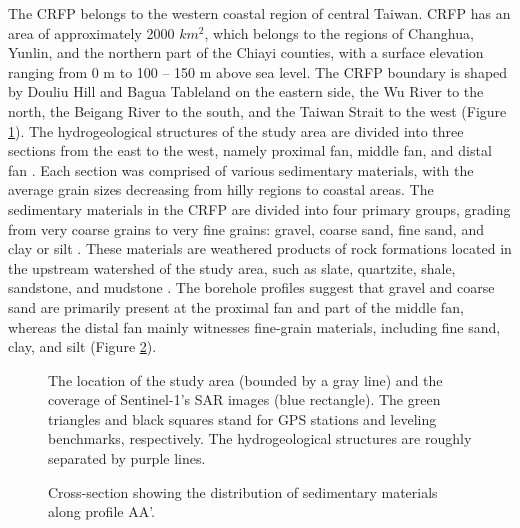 
The CRFP belongs to the western coastal region of central Taiwan. CRFP has an area of approximately 2000 $km^2$, which belongs to the regions of Changhua, Yunlin, and the northern part of the Chiayi counties, with a surface elevation ranging from 0 m to 100 – 150 m above sea level. The CRFP boundary is shaped by Douliu Hill and Bagua Tableland on the eastern side, the Wu River to the north, the Beigang River to the south, and the Taiwan Strait to the west (Figure \ref{fig:studyarea}).
The hydrogeological structures of the study area are divided into three sections from the east to the west, namely proximal fan, middle fan, and distal fan \citep{RN46}. Each section was comprised of various sedimentary materials, with the average grain sizes decreasing from hilly regions to coastal areas. The sedimentary materials in the CRFP are divided into four primary groups, grading from very coarse grains to very fine grains: gravel, coarse sand, fine sand, and clay or silt \citep{RN46}. These materials are weathered products of rock formations located in the upstream watershed of the study area, such as slate, quartzite, shale, sandstone, and mudstone \citep{RN17, RN47}. The borehole profiles suggest that gravel and coarse sand are primarily present at the proximal fan and part of the middle fan, whereas the distal fan mainly witnesses fine-grain materials, including fine sand, clay, and silt (Figure \ref{fig:crosssection}).


\begin{figure}[H]
	\centering
	
	\framebox{\rule{0pt}{7cm}\rule{12.5cm}{0pt}}
	
	\caption[Study Area]{%
		The location of the study area (bounded by a gray line) and the coverage of Sentinel-1’s SAR images (blue rectangle). The green triangles and black squares stand for GPS stations and leveling benchmarks, respectively. The hydrogeological structures are roughly separated by purple lines.%
		\label{fig:studyarea}%
	}	
\end{figure}



\begin{figure}[H]
	\centering
	\framebox{\rule{0pt}{5cm}\rule{\textwidth}{0pt}}
	\captionsetup{justification=centering}
	\caption[Cross-section]{
		Cross-section showing the distribution of sedimentary materials along profile AA'.
		\label{fig:crosssection}
	}	
\end{figure}